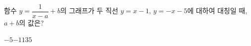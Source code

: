 \hspace*{2mm}\begin{minipage}[t]{\dimexpr\linewidth-2mm\relax}\vspace{0pt}
함수 $y=\dfrac{1}{x-a}+b$의 그래프가 두 직선 $y=x-1$, $y=-x-5$에 대하여 대칭일 때, $a+b$의 값은? 
\begin{choices32}{$-5$}{$-1$}{$1$}{$3$}{$5$}\end{choices32}\end{minipage}
